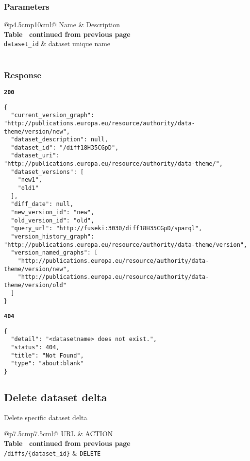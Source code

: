 \subsubsection{Parameters}
\begin{longtable}[c]{@{}p{4.5cm}p{10cm}l@{}}
  \toprule
  Name                 & Description                          \\* \midrule
  \endfirsthead
  \multicolumn{3}{c}%
  {{\bfseries Table \thetable\ continued from previous page}} \\
  \endhead
  \bottomrule
  \endfoot
  \endlastfoot
  \texttt{dataset\_id} & dataset unique name                  \\* \bottomrule
  \label{tab:rdf-differ-get-diff-parameters}                  \\
\end{longtable}

\subsubsection{Response}
\textbf{\texttt{200}}
\begin{lstlisting}
{
  "current_version_graph": "http://publications.europa.eu/resource/authority/data-theme/version/new",
  "dataset_description": null,
  "dataset_id": "/diff18H35CGpD",
  "dataset_uri": "http://publications.europa.eu/resource/authority/data-theme/",
  "dataset_versions": [
    "new1",
    "old1"
  ],
  "diff_date": null,
  "new_version_id": "new",
  "old_version_id": "old",
  "query_url": "http://fuseki:3030/diff18H35CGpD/sparql",
  "version_history_graph": "http://publications.europa.eu/resource/authority/data-theme/version",
  "version_named_graphs": [
    "http://publications.europa.eu/resource/authority/data-theme/version/new",
    "http://publications.europa.eu/resource/authority/data-theme/version/old"
  ]
}
\end{lstlisting}

\textbf{\texttt{404}}
\begin{lstlisting}
{
  "detail": "<datasetname> does not exist.",
  "status": 404,
  "title": "Not Found",
  "type": "about:blank"
}
\end{lstlisting}

\subsection{Delete dataset delta}
Delete specific dataset delta

\begin{longtable}[c]{@{}p{7.5cm}p{7.5cm}l@{}}
  \toprule
  URL                             & ACTION                    \\* \midrule
  \endfirsthead
  \multicolumn{3}{c}%
  {{\bfseries Table \thetable\ continued from previous page}} \\
  \endhead
  \bottomrule
  \endfoot
  \endlastfoot
  \texttt{/diffs/\{dataset\_id\}} & \texttt{DELETE}           \\* \bottomrule
  \label{tab:rdf-differ-delete-diffs}                         \\
\end{longtable}

